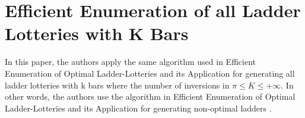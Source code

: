 \section{Efficient Enumeration of all Ladder Lotteries with K Bars}

In this paper, the authors apply the same algorithm used in Efficient Enumeration of Optimal Ladder-Lotteries 
and its Application for generating all ladder lotteries with k bars where the number of inversions in $\pi \leq K \leq +\infty$.
In other words, the authors use the algorithm in Efficient Enumeration of Optimal Ladder-Lotteries and its Application for generating 
non-optimal ladders \cite{A4}.